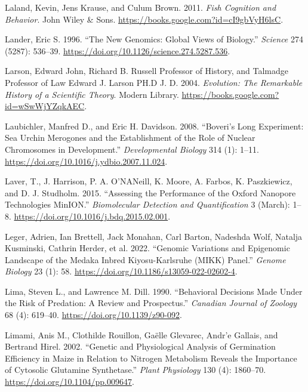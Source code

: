 \documentclass[
]{book}
\newlength{\cslhangindent}
\newlength{\cslentryspacingunit} %
\newenvironment{CSLReferences}[2] %
 {%
  \setlength{\parindent}{0pt}
  \ifodd #1
  \let\oldpar\par
  \def\par{\hangindent=\cslhangindent\oldpar}
  \fi
  \setlength{\parskip}{#2\cslentryspacingunit}
 }%
 {}
\begin{document}
\begin{CSLReferences}{1}{0}
\leavevmode{}%
Laland, Kevin, Jens Krause, and Culum Brown. 2011. \emph{Fish {Cognition} and {Behavior}}. {John Wiley \& Sons}. \url{https://books.google.com?id=cI9gbVyH6lsC}.

\leavevmode{}%
Lander, Eric S. 1996. {``The {New Genomics}: {Global Views} of {Biology}.''} \emph{Science} 274 (5287): 536--39. \url{https://doi.org/10.1126/science.274.5287.536}.

\leavevmode{}%
Larson, Edward John, Richard B. Russell Professor of History, and Talmadge Professor of Law Edward J. Larson PH.D J. D. 2004. \emph{Evolution: {The Remarkable History} of a {Scientific Theory}}. {Modern Library}. \url{https://books.google.com?id=wSwWjYZqkAEC}.

\leavevmode{}%
Laubichler, Manfred D., and Eric H. Davidson. 2008. {``Boveri's Long Experiment: {Sea} Urchin Merogones and the Establishment of the Role of Nuclear Chromosomes in Development.''} \emph{Developmental Biology} 314 (1): 1--11. \url{https://doi.org/10.1016/j.ydbio.2007.11.024}.

\leavevmode{}%
Laver, T., J. Harrison, P. A. O'NANeill, K. Moore, A. Farbos, K. Paszkiewicz, and D. J. Studholm. 2015. {``Assessing the Performance of the {Oxford Nanopore Technologies MinION}.''} \emph{Biomolecular Detection and Quantification} 3 (March): 1--8. \url{https://doi.org/10.1016/j.bdq.2015.02.001}.

\leavevmode{}%
Leger, Adrien, Ian Brettell, Jack Monahan, Carl Barton, Nadeshda Wolf, Natalja Kusminski, Cathrin Herder, et al. 2022. {``Genomic Variations and Epigenomic Landscape of the {Medaka Inbred Kiyosu-Karlsruhe} ({MIKK}) Panel.''} \emph{Genome Biology} 23 (1): 58. \url{https://doi.org/10.1186/s13059-022-02602-4}.

\leavevmode{}%
Lima, Steven L., and Lawrence M. Dill. 1990. {``Behavioral Decisions Made Under the Risk of Predation: A Review and Prospectus.''} \emph{Canadian Journal of Zoology} 68 (4): 619--40. \url{https://doi.org/10.1139/z90-092}.

\leavevmode{}%
Limami, Anis M., Clothilde Rouillon, Gaëlle Glevarec, Andr'e Gallais, and Bertrand Hirel. 2002. {``Genetic and {Physiological Analysis} of {Germination Efficiency} in {Maize} in {Relation} to {Nitrogen Metabolism Reveals} the {Importance} of {Cytosolic Glutamine Synthetase}.''} \emph{Plant Physiology} 130 (4): 1860--70. \url{https://doi.org/10.1104/pp.009647}.


\end{CSLReferences}
\end{document}
